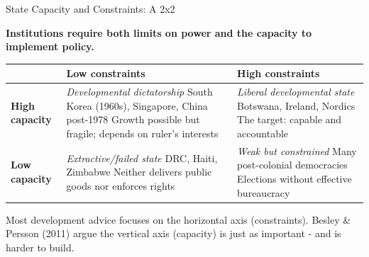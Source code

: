 \documentclass[10pt]{beamer}
\begin{document}
\begin{frame}{State Capacity and Constraints: A 2x2}

\textbf{Institutions require both limits on power and the capacity to implement policy.}


\begin{center}
\begin{tabular}{p{2.2cm}|p{3.8cm}|p{3.8cm}}
& \textbf{Low constraints} & \textbf{High constraints} \\
\hline
\textbf{High capacity} & \textit{Developmental dictatorship} \newline South Korea (1960s), Singapore, China post-1978 \newline \footnotesize Growth possible but fragile; depends on ruler's interests & \textit{Liberal developmental state} \newline Botswana, Ireland, Nordics \newline \footnotesize \alert{The target: capable and accountable} \\
\hline
\textbf{Low capacity} & \textit{Extractive/failed state} \newline DRC, Haiti, Zimbabwe \newline \footnotesize Neither delivers public goods nor enforces rights & \textit{Weak but constrained} \newline Many post-colonial democracies \newline \footnotesize Elections without effective bureaucracy \\
\end{tabular}
\end{center}


\footnotesize Most development advice focuses on the horizontal axis (constraints). Besley \& Persson (2011) argue the vertical axis (capacity) is just as important - and is harder to build.
\end{frame}
\end{document}
